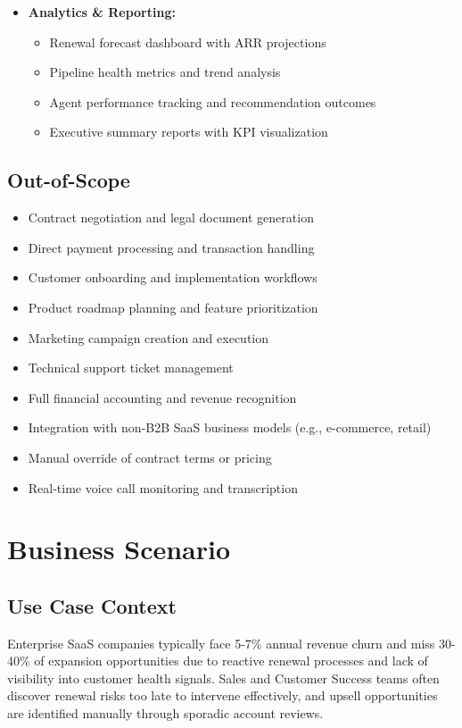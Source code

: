 \documentclass[12pt,a4paper]{article}
\begin{document}
\begin{itemize}
\begin{itemize}
        \item Webhook-based real-time data synchronization
    \end{itemize}
    \item \textbf{Analytics \& Reporting:}
    \begin{itemize}
        \item Renewal forecast dashboard with ARR projections
        \item Pipeline health metrics and trend analysis
        \item Agent performance tracking and recommendation outcomes
        \item Executive summary reports with KPI visualization
    \end{itemize}
\end{itemize}

\subsection{Out-of-Scope}
\begin{itemize}
    \item Contract negotiation and legal document generation
    \item Direct payment processing and transaction handling
    \item Customer onboarding and implementation workflows
    \item Product roadmap planning and feature prioritization
    \item Marketing campaign creation and execution
    \item Technical support ticket management
    \item Full financial accounting and revenue recognition
    \item Integration with non-B2B SaaS business models (e.g., e-commerce, retail)
    \item Manual override of contract terms or pricing
    \item Real-time voice call monitoring and transcription
\end{itemize}

\section{Business Scenario}

\subsection{Use Case Context}
Enterprise SaaS companies typically face 5-7\% annual revenue churn and miss 30-40\% of expansion opportunities due to reactive renewal processes and lack of visibility into customer health signals. Sales and Customer Success teams often discover renewal risks too late to intervene effectively, and upsell opportunities are identified manually through sporadic account reviews.
\end{document}
